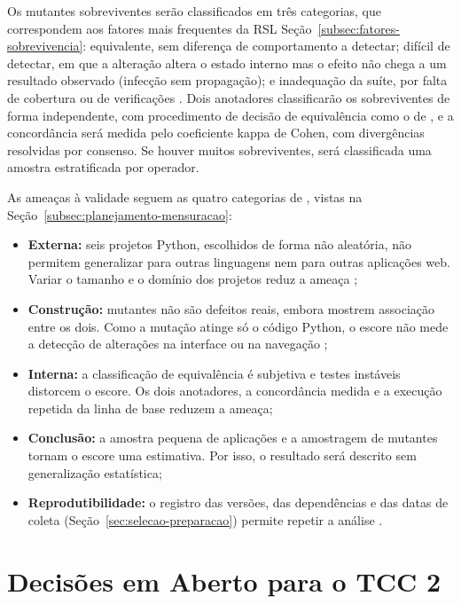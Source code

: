 Os mutantes sobreviventes serão classificados em três categorias, que correspondem aos fatores mais frequentes da RSL Seção~\ref{subsec:fatores-sobrevivencia}: equivalente, sem diferença de comportamento a detectar; difícil de detectar, em que a alteração altera o estado interno mas o efeito não chega a um resultado observado (infecção sem propagação); e inadequação da suíte, por falta de cobertura ou de verificações \cite{ammann2016, barr2015}. Dois anotadores classificarão os sobreviventes de forma independente, com procedimento de decisão de equivalência como o de , e a concordância será medida pelo coeficiente kappa de Cohen, com divergências resolvidas por consenso. Se houver muitos sobreviventes, será classificada uma amostra estratificada por operador.

As ameaças à validade seguem as quatro categorias de , vistas na Seção~\ref{subsec:planejamento-mensuracao}:

\begin{itemize}
    \item \textbf{Externa:} seis projetos Python, escolhidos de forma não aleatória, não permitem generalizar para outras linguagens nem para outras aplicações web. Variar o tamanho e o domínio dos projetos reduz a ameaça \cite{ashong2025b};
    \item \textbf{Construção:} mutantes não são defeitos reais, embora  mostrem associação entre os dois. Como a mutação atinge só o código Python, o escore não mede a detecção de alterações na interface ou na navegação \cite{li2014webtesting};
    \item \textbf{Interna:} a classificação de equivalência é subjetiva e testes instáveis distorcem o escore. Os dois anotadores, a concordância medida e a execução repetida da linha de base reduzem a ameaça;
    \item \textbf{Conclusão:} a amostra pequena de aplicações e a amostragem de mutantes tornam o escore uma estimativa. Por isso, o resultado será descrito sem generalização estatística;
    \item \textbf{Reprodutibilidade:} o registro das versões, das dependências e das datas de coleta (Seção~\ref{sec:selecao-preparacao}) permite repetir a análise \cite{vidoni2022}.
\end{itemize}

\section{Decisões em Aberto para o TCC 2}
\label{sec:decisoes-abertas}

